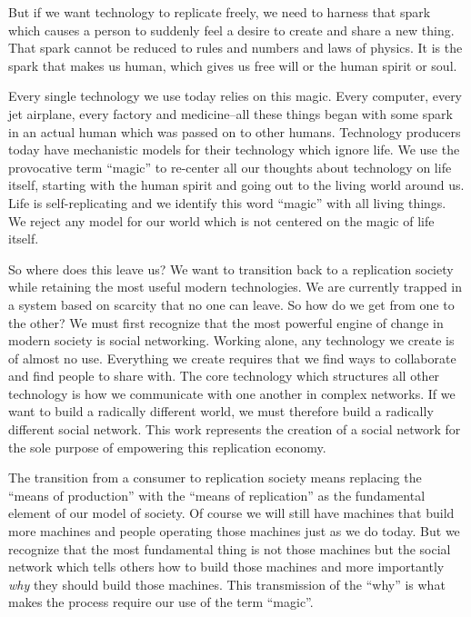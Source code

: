 But if we want technology to replicate freely, we need to harness that
spark which causes a person to suddenly feel a desire to create and
share a new thing. That spark cannot be reduced to rules and numbers and
laws of physics. It is the spark that makes us human, which gives us
free will or the human spirit or soul.

Every single technology we use today relies on this magic. Every
computer, every jet airplane, every factory and medicine--all these
things began with some spark in an actual human which was passed on to
other humans. Technology producers today have mechanistic models for
their technology which ignore life. We use the provocative term
``magic'' to re-center all our thoughts about technology on life itself,
starting with the human spirit and going out to the living world around
us. Life is self-replicating and we identify this word ``magic'' with
all living things. We reject any model for our world which is not
centered on the magic of life itself.

So where does this leave us? We want to transition back to a replication
society while retaining the most useful modern technologies. We are
currently trapped in a system based on scarcity that no one can leave.
So how do we get from one to the other? We must first recognize that the
most powerful engine of change in modern society is social networking.
Working alone, any technology we create is of almost no use. Everything
we create requires that we find ways to collaborate and find people to
share with. The core technology which structures all other technology is
how we communicate with one another in complex networks. If we want to
build a radically different world, we must therefore build a radically
different social network. This work represents the creation of a social
network for the sole purpose of empowering this replication economy.

The transition from a consumer to replication society means replacing
the ``means of production'' with the ``means of replication'' as the
fundamental element of our model of society. Of course we will still
have machines that build more machines and people operating those
machines just as we do today. But we recognize that the most fundamental
thing is not those machines but the social network which tells others
how to build those machines and more importantly \emph{why} they should
build those machines. This transmission of the ``why'' is what makes the
process require our use of the term ``magic''.

